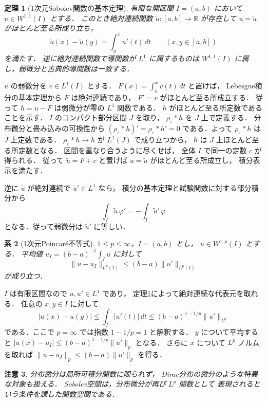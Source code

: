\documentclass[a5paper,10pt,onecolumn]{jsarticle}
\makeatletter
\theoremstyle{mathnotetheorem}
\newtheorem{theorem}{定理}[section]
\newtheorem{corollary}[theorem]{系}
\newtheorem{remark}[theorem]{注意}
\renewcommand{\proofname}{証明}
\renewenvironment{proof}[1][\proofname]{%
  \par\pushQED{\qed}\normalfont\topsep4\p@\@plus2\p@\relax
  \trivlist\item[\hskip\labelsep\bfseries #1]\ignorespaces
}{\popQED\endtrivlist\@endpefalse}
\newcommand{\norm}[1]{\lVert #1\rVert}
\makeatother
\begin{document}
\begin{theorem}[1次元Sobolev関数の基本定理]\label{thm:w11-ac}
有限な開区間 $I=(a,b)$ において
$u\in W^{1,1}(I)$ とする．
このとき絶対連続関数 $\widetilde u:[a,b]\to\mathbb R$ が存在して
$u=\widetilde u$ がほとんど至る所成り立ち，
\[
 \widetilde u(x)-\widetilde u(y)
 =\int_y^xu'(t)\,dt
 \qquad(x,y\in[a,b])
\]
を満たす．
逆に絶対連続関数で導関数が $L^1$ に属するものは
$W^{1,1}(I)$ に属し，弱微分と古典的導関数は一致する．
\end{theorem}
\begin{proof}
$u$ の弱微分を $v\in L^1(I)$ とする．
$F(x)=\int_a^xv(t)\,dt$ と置けば，
Lebesgue積分の基本定理から $F$ は絶対連続であり，
$F'=v$ がほとんど至る所成立する．
従って $h=u-F$ は弱微分が零の
$L^1$ 関数である．
$h$ がほとんど至る所定数であることを示す．
$I$ のコンパクト部分区間 $J$ を取り，
$\rho_\varepsilon*h$ を $J$ 上で定義する．
分布微分と畳み込みの可換性から
$(\rho_\varepsilon*h)'=\rho_\varepsilon*h'=0$
である．よって $\rho_\varepsilon*h$ は
$J$ 上定数である．
$\rho_\varepsilon*h\to h$ が $L^1(J)$ で成り立つから，
$h$ は $J$ 上ほとんど至る所定数となる．
区間を重なり合うように尽くせば，
全体 $I$ で同一の定数 $c$ が得られる．
従って $\widetilde u=F+c$ と置けば
$u=\widetilde u$ がほとんど至る所成立し，
積分表示を満たす．

逆に $\widetilde u$ が絶対連続で
$\widetilde u'\in L^1$ なら，
積分の基本定理と試験関数に対する部分積分から
\[
 \int_I\widetilde u\,\varphi'
 =-\int_I\widetilde u'\,\varphi
\]
となる．従って弱微分は $\widetilde u'$ に等しい．
\end{proof}

\begin{corollary}[1次元Poincar\'e不等式]\label{cor:poincare-1d}
$1\le p\le\infty$，$I=(a,b)$ とし，
$u\in W^{1,p}(I)$ とする．
平均値 $u_I=(b-a)^{-1}\int_Iu$ に対して
\[
 \norm{u-u_I}_{L^p(I)}
 \le(b-a)\norm{u'}_{L^p(I)}
\]
が成り立つ．
\end{corollary}
\begin{proof}
$I$ は有限区間なので $u,u'\in L^1$ であり，
定理\ref{thm:w11-ac}によって絶対連続な代表元を取れる．
任意の $x,y\in I$ に対して
\[
 |u(x)-u(y)|
 \le\int_I|u'(t)|\,dt
 \le(b-a)^{1-1/p}\norm{u'}_{L^p}
\]
である．ここで $p=\infty$ では指数 $1-1/p=1$
と解釈する．
$y$ について平均すると
$|u(x)-u_I|
 \le(b-a)^{1-1/p}\norm{u'}_p$ となる．
さらに $x$ について $L^p$ ノルムを取れば
$\norm{u-u_I}_p\le(b-a)\norm{u'}_p$ を得る．
\end{proof}

\begin{remark}
分布微分は局所可積分関数に限られず，
Dirac分布の微分のような特異な対象も扱える．
Sobolev空間は，分布微分が再び $L^p$ 関数として
表現されるという条件を課した関数空間である．
\end{remark}
\end{document}

